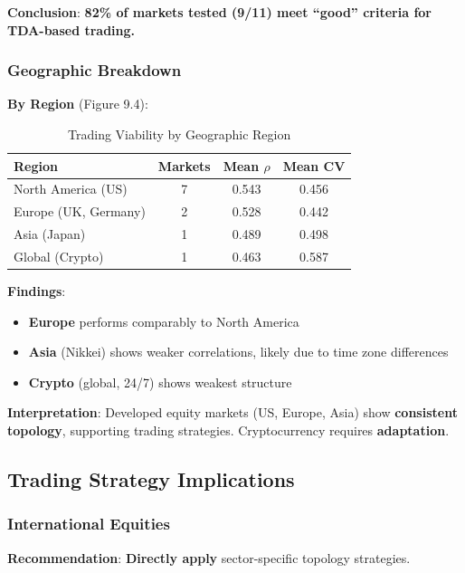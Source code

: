 \textbf{Conclusion}: \textbf{82\% of markets tested (9/11) meet ``good'' criteria for TDA-based trading.}

\subsubsection{Geographic Breakdown}

\textbf{By Region} (Figure 9.4):

\begin{table}[H]
\centering
\caption{Trading Viability by Geographic Region}
\label{tab:geographic-breakdown}
\begin{tabular}{@{}lccc@{}}
\toprule
\textbf{Region} & \textbf{Markets} & \textbf{Mean $\rho$} & \textbf{Mean CV} \\
\midrule
North America (US) & 7 & 0.543 & 0.456 \\
Europe (UK, Germany) & 2 & 0.528 & 0.442 \\
Asia (Japan) & 1 & 0.489 & 0.498 \\
Global (Crypto) & 1 & 0.463 & 0.587 \\
\bottomrule
\end{tabular}
\end{table}

\textbf{Findings}:
\begin{itemize}
\item \textbf{Europe} performs comparably to North America
\item \textbf{Asia} (Nikkei) shows weaker correlations, likely due to time zone differences
\item \textbf{Crypto} (global, 24/7) shows weakest structure
\end{itemize}

\textbf{Interpretation}: Developed equity markets (US, Europe, Asia) show \textbf{consistent topology}, supporting trading strategies. Cryptocurrency requires \textbf{adaptation}.

\subsection{Trading Strategy Implications}

\subsubsection{International Equities}

\textbf{Recommendation}: \textbf{Directly apply} sector-specific topology strategies.

